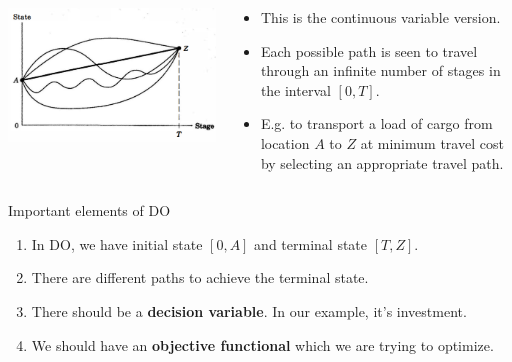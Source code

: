 \documentclass[
  ignorenonframetext,
]{beamer}
\providecommand{\tightlist}{%
  \setlength{\itemsep}{0pt}\setlength{\parskip}{0pt}}\usepackage{longtable,booktabs,array}
\begin{document}
\begin{frame}{}
\label{section-2}
\begin{columns}[T]
\begin{column}{0.7\textwidth}
\includegraphics[width=4\textwidth,height=\textheight]{images/do_paths_continuous.png}
\end{column}

\begin{column}{0.3\textwidth}
\begin{itemize}
\tightlist
\item
  This is the continuous variable version.
\item
  Each possible path is seen to travel through an infinite number of
  stages in the interval \([0, T]\).
\item
  E.g. to transport a load of cargo from location \(A\) to \(Z\) at
  minimum travel cost by selecting an appropriate travel path.
\end{itemize}
\end{column}
\end{columns}
\end{frame}

\begin{frame}{Important elements of DO}
\label{important-elements-of-do}
\begin{enumerate}
\tightlist
\item
  In DO, we have initial state \([0,A]\) and terminal state \([T, Z]\).
\item
  There are different paths to achieve the terminal state.
\item
  There should be a \textbf{decision variable}. In our example, it's
  investment.
\item
  We should have an \textbf{objective functional} which we are trying to
  optimize.
\end{enumerate}
\end{frame}
\end{document}
